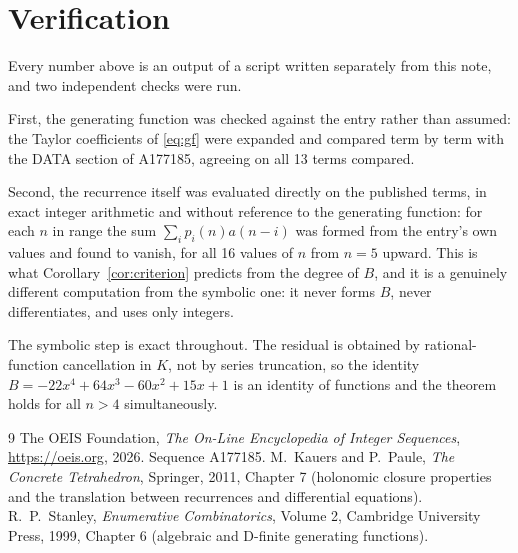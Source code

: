 \documentclass[11pt,a4paper]{article}
\theoremstyle{plain}
\theoremstyle{definition}
\begin{document}
\section{Verification}

Every number above is an output of a script written separately from this note, and two
independent checks were run.

First, the generating function was checked against the entry rather than assumed: the
Taylor coefficients of \eqref{eq:gf} were expanded and compared term by term with the DATA
section of A177185, agreeing on all 13 terms compared.

Second, the recurrence itself was evaluated directly on the published terms, in exact
integer arithmetic and without reference to the generating function: for each $n$ in range
the sum $\sum_{i}p_{i}(n)a(n-i)$ was formed from the entry's own values and found to
vanish, for all 16 values of $n$ from $n=5$ upward. This is what
Corollary~\ref{cor:criterion} predicts from the degree of $B$, and it is a genuinely
different computation from the symbolic one: it never forms $B$, never differentiates, and
uses only integers.

The symbolic step is exact throughout. The residual is obtained by rational-function
cancellation in $K$, not by series truncation, so the identity $B=- 22 x^{4} + 64 x^{3} - 60 x^{2} + 15 x + 1$ is an
identity of functions and the theorem holds for all $n>4$ simultaneously.

\begin{thebibliography}{9}
 The OEIS Foundation, \emph{The On-Line Encyclopedia of Integer Sequences},
\url{https://oeis.org}, 2026. Sequence A177185.
 M.~Kauers and P.~Paule, \emph{The Concrete Tetrahedron}, Springer, 2011,
Chapter 7 (holonomic closure properties and the translation between recurrences and
differential equations).
 R.~P.~Stanley, \emph{Enumerative Combinatorics}, Volume 2, Cambridge
University Press, 1999, Chapter 6 (algebraic and D-finite generating functions).
\end{thebibliography}
\end{document}
